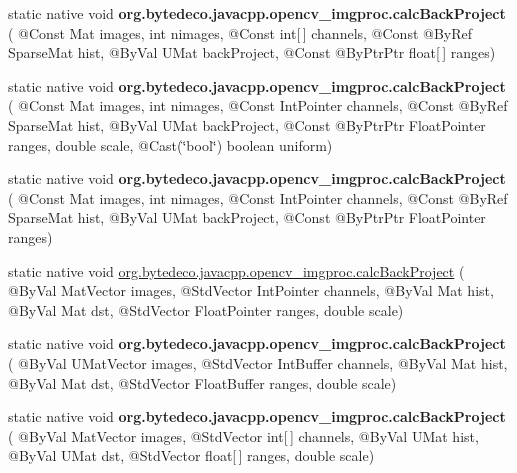 \begin{DoxyCompactItemize}
static native void {\bfseries org.\+bytedeco.\+javacpp.\+opencv\+\_\+imgproc.\+calc\+Back\+Project} ( @Const Mat images, int nimages, @Const int\mbox{[}$\,$\mbox{]} channels, @Const @By\+Ref Sparse\+Mat hist, @By\+Val U\+Mat back\+Project, @Const @By\+Ptr\+Ptr float\mbox{[}$\,$\mbox{]} ranges)
\item 
\mbox{\label{group__imgproc__hist_ga466a1eb085e7de6a3fa44da45bb94b81}} 
static native void {\bfseries org.\+bytedeco.\+javacpp.\+opencv\+\_\+imgproc.\+calc\+Back\+Project} ( @Const Mat images, int nimages, @Const Int\+Pointer channels, @Const @By\+Ref Sparse\+Mat hist, @By\+Val U\+Mat back\+Project, @Const @By\+Ptr\+Ptr Float\+Pointer ranges, double scale, @Cast(\char`\"{}bool\char`\"{}) boolean uniform)
\item 
\mbox{\label{group__imgproc__hist_ga2f84a535e604b6da885d5701892d6aa3}} 
static native void {\bfseries org.\+bytedeco.\+javacpp.\+opencv\+\_\+imgproc.\+calc\+Back\+Project} ( @Const Mat images, int nimages, @Const Int\+Pointer channels, @Const @By\+Ref Sparse\+Mat hist, @By\+Val U\+Mat back\+Project, @Const @By\+Ptr\+Ptr Float\+Pointer ranges)
\item 
static native void \hyperlink{group__imgproc__hist_ga08b1470561cb4171cc528b2bdba50764}{org.\+bytedeco.\+javacpp.\+opencv\+\_\+imgproc.\+calc\+Back\+Project} ( @By\+Val Mat\+Vector images, @Std\+Vector Int\+Pointer channels, @By\+Val Mat hist, @By\+Val Mat dst, @Std\+Vector Float\+Pointer ranges, double scale)
\item 
\mbox{\label{group__imgproc__hist_gad2b95344d44522fbf00d6f9abc933d8d}} 
static native void {\bfseries org.\+bytedeco.\+javacpp.\+opencv\+\_\+imgproc.\+calc\+Back\+Project} ( @By\+Val U\+Mat\+Vector images, @Std\+Vector Int\+Buffer channels, @By\+Val Mat hist, @By\+Val Mat dst, @Std\+Vector Float\+Buffer ranges, double scale)
\item 
\mbox{\label{group__imgproc__hist_ga94d3f79ad555fa1efe2f2eee33c37147}} 
static native void {\bfseries org.\+bytedeco.\+javacpp.\+opencv\+\_\+imgproc.\+calc\+Back\+Project} ( @By\+Val Mat\+Vector images, @Std\+Vector int\mbox{[}$\,$\mbox{]} channels, @By\+Val U\+Mat hist, @By\+Val U\+Mat dst, @Std\+Vector float\mbox{[}$\,$\mbox{]} ranges, double scale)
\item 
\mbox{\label{group__imgproc__hist_gaca8cc1c91710dcbd933e5a39993769a9}} 

\end{DoxyCompactItemize}
